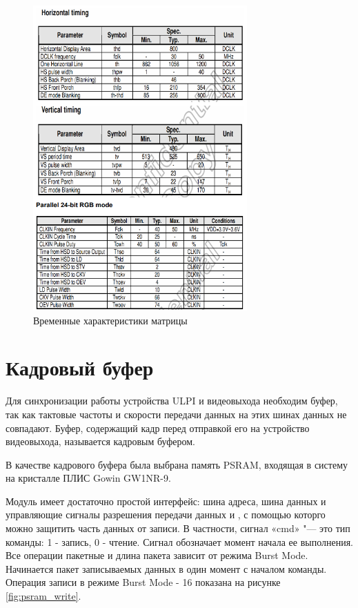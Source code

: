 \begin{figure}[ht]
    \centering
    \includegraphics[scale=0.5]{res/img/lcd_timing.png}
    \caption{Временные характеристики матрицы \cite{lcd:display}}
    \label{fig:lcd_timing}
\end{figure}

\section{Кадровый буфер}

Для синхронизации работы устройства ULPI и видеовыхода необходим буфер, так как тактовые частоты и скорости передачи данных на этих шинах данных не совпадают. Буфер, содержащий кадр перед отправкой его на устройство видеовыхода, называется кадровым буфером.

В качестве кадрового буфера была выбрана память PSRAM, входящая в систему на кристалле ПЛИС Gowin GW1NR-9.

Модуль имеет достаточно простой интерфейс: шина адреса, шина данных и управляющие сигналы разрешения передачи данных и , с помощью которго можно защитить часть данных от записи. В частности, сигнал «cmd» "--- это тип команды: 1 - запись, 0 - чтение. Сигнал  обозначает момент начала ее выполнения. Все операции пакетные и длина пакета зависит от режима Burst Mode. Начинается пакет записываемых данных в один момент с началом команды. Операция записи в режиме Burst Mode - 16 показана на рисунке \ref{fig:psram_write}.

